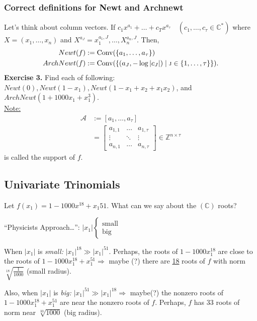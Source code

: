\documentclass[]{article}
\theoremstyle{definition}
\begin{document}
			\subsubsection{Correct definitions for Newt and Archnewt}
			Let's think about column vectors. If $c_1x^{a_1}+\dots+c_Tx^{a_\tau} \quad (c_1,\dots,c_\tau \in \mathbb{C}^{*})$ where $X=(x_1,\dots,x_n)$ and $X^{a_{J}}=x_1^{a_1,J},\dots, X_n^{a_n,J}$. Then,
			\begin{align*}
			Newt(f) &: = \text{Conv}(\{a_1,\ldots,a_\tau\}) \\
			ArchNewt(f) &: = \text{Conv}(\{(a_J,-\log|c_J|) \mid \text{\scriptsize{J}} \in \{1,\ldots,\tau\}\}).
			\end{align*}
			\textbf{Exercise 3.} Find each of following: $Newt(0), Newt(1-x_1), Newt(1-x_1+x_2+x_1x_2)$, and $ArchNewt(1+1000x_1+x_1^3)$.
						\vspace{.25in}
			\\
			\underline{Note:} 
			\begin{align*}
			\mathcal{A} &:= [a_1,\ldots, a_\tau]\\
			&= \left[\begin{array}{ccc}a_{1,1} & \ldots & a_{1,\tau} \\\vdots & \ddots & \vdots \\a_{n,1} & \dots & a_{n,\tau}\end{array}\right] \in \mathbb{Z}^{n\times\tau}
			\end{align*}
			is called the support of $f$.
			\subsection{Univariate Trinomials}
			Let $f(x_1)=1-1000x^18+x_1{51}$. What can we say about the $(\mathbb{C})$ roots?
			
			\begin{center}``Physicists Approach\ldots'': $|x_1|
			\begin{cases}
			\text{small}\\
			\text{big}
			\end{cases}
			$\end{center}
			
			When $|x_1|$ is \emph{small:} $|x_1|^{18} \gg|x_1|^{51}$. Perhaps, the roots of $1-1000x_1^{18}$ are close to the roots of $1-1000x_1^{18}+x_1^{51} \Rightarrow$ maybe (?) there are \underline{18} roots of $f$ with norm $\sqrt[18]{\frac{1}{1000}}$ (small radius).
			
			Also, when $|x_1|$ is \emph{big:} $|x_1|^{51}\gg|x_1|^{18} \Rightarrow$ maybe(?) the nonzero roots of $1-1000x_1^{18}+x_1^{51}$ are near the nonzero roots of $f$. Perhaps, $f$ has 33 roots of norm near $\sqrt[33]{1000}$ (big radius).
			\\
			
\end{document}
